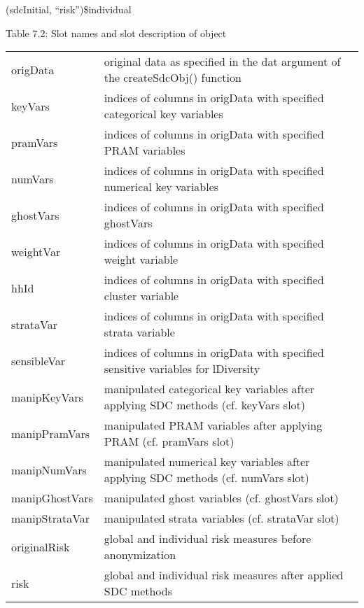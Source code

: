 \documentclass[letterpaper,10pt,english]{sphinxmanual}
\begin{document}
(sdcInitial, “risk”)\$individual

Table 7.2: Slot names and slot description of  object


\begin{savenotes}\sphinxattablestart
\centering
\begin{tabulary}{\linewidth}[t]{|T|T|}
\hline
\sphinxstyletheadfamily 
{}
&\sphinxstyletheadfamily 
{}
\\
\hline
origData
&
original data as specified in the
dat argument of the
createSdcObj() function
\\
\hline
keyVars
&
indices of columns in origData
with specified categorical key
variables
\\
\hline
pramVars
&
indices of columns in origData
with specified PRAM variables
\\
\hline
numVars
&
indices of columns in origData
with specified numerical key
variables
\\
\hline
ghostVars
&
indices of columns in origData
with specified ghostVars
\\
\hline
weightVar
&
indices of columns in origData
with specified weight variable
\\
\hline
hhId
&
indices of columns in origData
with specified cluster variable
\\
\hline
strataVar
&
indices of columns in origData
with specified strata variable
\\
\hline
sensibleVar
&
indices of columns in origData
with specified sensitive
variables for lDiversity
\\
\hline
manipKeyVars
&
manipulated categorical key
variables after applying SDC
methods (cf. keyVars slot)
\\
\hline
manipPramVars
&
manipulated PRAM variables after
applying PRAM (cf. pramVars slot)
\\
\hline
manipNumVars
&
manipulated numerical key
variables after applying SDC
methods (cf. numVars slot)
\\
\hline
manipGhostVars
&
manipulated ghost variables (cf.
ghostVars slot)
\\
\hline
manipStrataVar
&
manipulated strata variables (cf.
strataVar slot)
\\
\hline
originalRisk
&
global and individual risk
measures before anonymization
\\
\hline
risk
&
global and individual risk
measures after applied SDC
methods
\\

\end{tabulary}
\end{savenotes}
\end{document}
